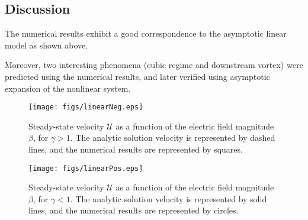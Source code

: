 \documentclass[final]{elsarticle}
\newcommand\cU{\mathscr{U}}
\begin{document}
\subsection{Discussion}
The numerical results exhibit a good correspondence to the asymptotic linear model as
shown above.

Moreover, two interesting phenomena (cubic regime and downstream vortex) were predicted
using the numerical results, and later verified using asymptotic expansion of the
nonlinear system.


\begin{figure}[htbp]
    \begin{center}
    \texttt{[image: figs/linearNeg.eps]}
    \caption{Steady-state velocity $\cU$ as a function of the 
        electric field magnitude $\beta$, for $\gamma > 1$. 
        The analytic solution velocity is represented by dashed lines, and the numerical
        results are represented by squares.}
    \label{fig:Linear1}
    \end{center}
\end{figure}

\begin{figure}[htbp]
    \begin{center}
    \texttt{[image: figs/linearPos.eps]}
    \caption{Steady-state velocity $\cU$ as a function of the 
        electric field magnitude $\beta$, for $\gamma < 1$. 
        The analytic solution velocity is represented by solid lines, and the numerical
        results are represented by circles.}
    \label{fig:Linear2}
    \end{center}
\end{figure}
\end{document}
